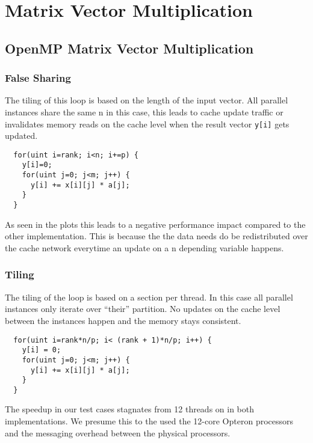 \chapter{Matrix Vector Multiplication}
\section{OpenMP Matrix Vector Multiplication}
\falsesharingvarprocsA
{}\tilingvarprocsA

\subsection{False Sharing}

The tiling of this loop is based on the length of the input vector.
All parallel instances share the same n in this case, this leads to cache update traffic or invalidates memory reads on the cache level when the result vector \texttt{y[i]} gets updated.

\begin{lstlisting}
  for(uint i=rank; i<n; i+=p) {
    y[i]=0;
    for(uint j=0; j<m; j++) {
      y[i] += x[i][j] * a[j];
    }
  }
\end{lstlisting}

As seen in the plots this leads to a negative performance impact compared to the other implementation.
This is because the the data needs do be redistributed over the cache network everytime an update on a n depending variable happens.

\subsection{Tiling}

The tiling of the loop is based on a section per thread.
In this case all parallel instances only iterate over ``their'' partition. No updates on the cache level between the instances happen and the memory stays consistent.

\begin{lstlisting}
  for(uint i=rank*n/p; i< (rank + 1)*n/p; i++) {
    y[i] = 0;
    for(uint j=0; j<m; j++) {
      y[i] += x[i][j] * a[j];
    }
  }
\end{lstlisting}

The speedup in our test cases  stagnates from 12 threads on in both implementations.
We presume this to the used the 12-core Opteron processors and the messaging overhead between the physical processors.



